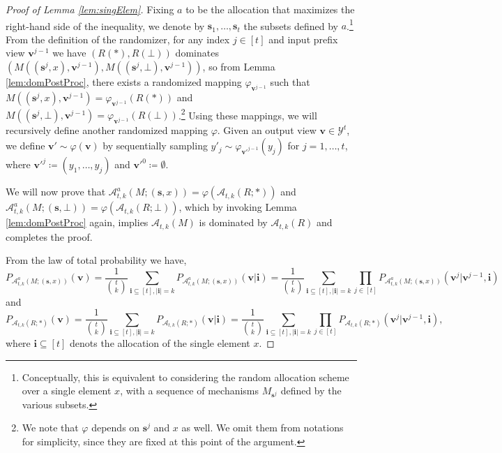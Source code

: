 \documentclass{article}
\theoremstyle{plain}
\theoremstyle{definition}
\newcommand{\out}{y}
\newcommand{\outDom}{\mathcal{Y}}
\newcommand{\alg}{M}
\newcommand{\rand}{R}
\newcommand{\dataset}{\boldsymbol{s}}
\newcommand{\view}{\boldsymbol{v}}
\newcommand{\alloc}[2]{\mathcal{A}_{#1}\left(#2\right)}
\newcommand{\allocFunc}[3]{\mathcal{A}_{#1}\left(#2; #3\right)}
\begin{document}
\begin{proof}[Proof of Lemma \ref{lem:singElem}]
    Fixing $a$ to be the allocation that maximizes the right-hand side of the inequality, we denote by $\dataset_{1}, \ldots, \dataset_{t}$ the subsets defined by $a$.\footnote{Conceptually, this is equivalent to considering the random allocation scheme over a single element $x$, with a sequence of mechanisms $\alg_{\dataset^{j}}$ defined by the various subsets.} From the definition of the randomizer, for any index $j \in [t]$ and input prefix view $\view^{j-1}$ we have $(\rand(*), \rand(\bot))$ dominates $(\alg((\dataset^{j}, x), \view^{j-1}), \alg((\dataset^{j}, \bot), \view^{j-1}))$, so from Lemma \ref{lem:domPostProc}, there exists a randomized mapping $\varphi_{\view^{j-1}}$ such that $\alg((\dataset^{j}, x), \view^{j-1}) = \varphi_{\view^{j-1}}(\rand(*))$ and $\alg((\dataset^{j}, \bot), \view^{j-1}) = \varphi_{\view^{j-1}}(\rand(\bot))$.\footnote{We note that $\varphi$ depends on $\dataset^{j}$ and $x$ as well. We omit them from notations for simplicity, since they are fixed at this point of the argument.}
    Using these mappings, we will recursively define another randomized mapping $\varphi$. Given an output view $\view \in \outDom^{t}$, we define $\view' \sim \varphi(\view)$ by sequentially sampling $\out'_{j} \sim \varphi_{\view'^{j-1}}(\out_{j})$ for $j = 1, \ldots ,t$, where $\view'^{j} \coloneqq (\out_{1}, \ldots, \out_{j})$ and $\view'^{0} \coloneqq \emptyset$.

    We will now prove that $\mathcal{A}_{t, k}^{a}(\alg; (\dataset, x)) = \varphi(\allocFunc{t, k}{\rand}{*})$ and $\mathcal{A}_{t, k}^{a}(\alg; (\dataset, \bot)) = \varphi(\allocFunc{t, k}{\rand}{\bot})$, which by invoking Lemma \ref{lem:domPostProc} again, implies $\alloc{t, k}{\alg}$ is dominated by $\alloc{t, k}{\rand}$ and completes the proof.

    From the law of total probability we have,
    \[
        P_{\mathcal{A}_{t, k}^{a}(\alg; (\dataset, x))}(\view) = \frac{1}{\binom{t}{k}} \underset{\boldsymbol{i} \subseteq [t], \vert \boldsymbol{i} \vert = k}{\sum} P_{\mathcal{A}_{t, k}^{a}(\alg; (\dataset, x))}(\view \vert \boldsymbol{i}) = \frac{1}{\binom{t}{k}} \underset{\boldsymbol{i} \subseteq [t], \vert \boldsymbol{i} \vert = k}{\sum} \prod_{j \in [t]} P_{\mathcal{A}_{t, k}^{a}(\alg; (\dataset, x))}(\view^{j} \vert \view^{j-1}, \boldsymbol{i})
    \]
    and
    \[
        P_{\allocFunc{t, k}{\rand}{*}}(\view) = \frac{1}{\binom{t}{k}} \underset{\boldsymbol{i} \subseteq [t], \vert \boldsymbol{i} \vert = k}{\sum} P_{\allocFunc{t, k}{\rand}{*}}(\view \vert \boldsymbol{i}) = \frac{1}{\binom{t}{k}} \underset{\boldsymbol{i} \subseteq [t], \vert \boldsymbol{i} \vert = k}{\sum}  \prod_{j \in [t]} P_{\allocFunc{t, k}{\rand}{*}}(\view^{j} \vert \view^{j-1}, \boldsymbol{i}),
    \]
    where $\boldsymbol{i} \subseteq [t]$ denots the allocation of the single element $x$.


\end{proof}
\end{document}
